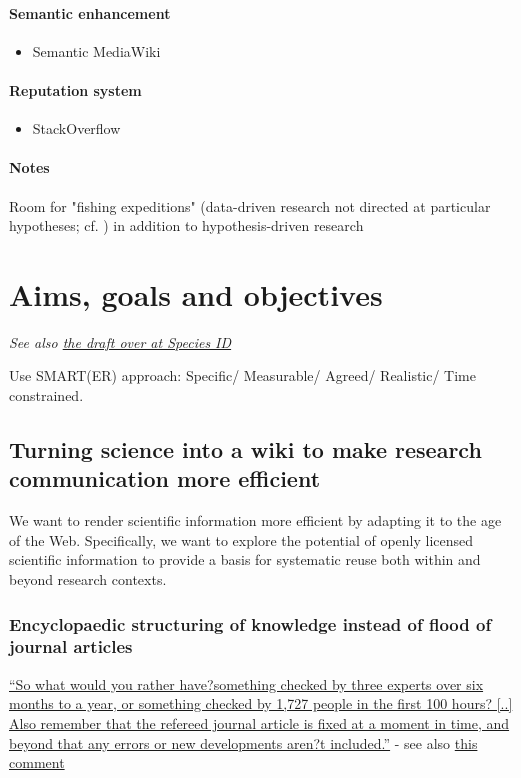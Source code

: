 \documentclass[final,authoryear,3p]{elsarticle-open-drafting}
\begin{document}
\paragraph{Semantic enhancement}
\begin{itemize}
	\item Semantic MediaWiki
\end{itemize}

\paragraph{Reputation system}
\begin{itemize}
	\item StackOverflow
\end{itemize}

\paragraph{Notes}
Room for "fishing expeditions" (data-driven research not directed at particular hypotheses; cf. \href{http://dx.doi.org/10.1091/mbc.E09}{\citep{botstein2010d}}) in addition to hypothesis-driven research

\section{Aims, goals and objectives}
{\it See also \href{http://species-id.net/wiki/Draft:Encyclopaedia_of_original_research#Aims,_Goals_and_Objectives}{the draft over at Species ID}}


Use SMART(ER) approach: 
Specific/ 
Measurable/ 
Agreed/ 
Realistic/ 
Time constrained.

\subsection{Turning science into a wiki to make research communication more efficient}
We want to render scientific information more efficient by adapting it to the age of the Web. Specifically, we want to explore the potential of openly licensed scientific information to provide a basis for systematic reuse both within and beyond research contexts. 
\subsubsection{Encyclopaedic structuring of knowledge instead of flood of journal articles}
\href{http://nextbison.wordpress.com/2011/05/18/should-you-believe-wikipedia/}{``So what would you rather have?something checked by three experts over six months to a year, or something checked by 1,727 people in the first 100 hours?  [..]  Also remember that the refereed journal article is fixed at a moment in time, and beyond that any errors or new developments aren?t included.''} - see also \href{http://nextbison.wordpress.com/2011/05/18/should-you-believe-wikipedia/#comment-486}{this comment}
\end{document}
